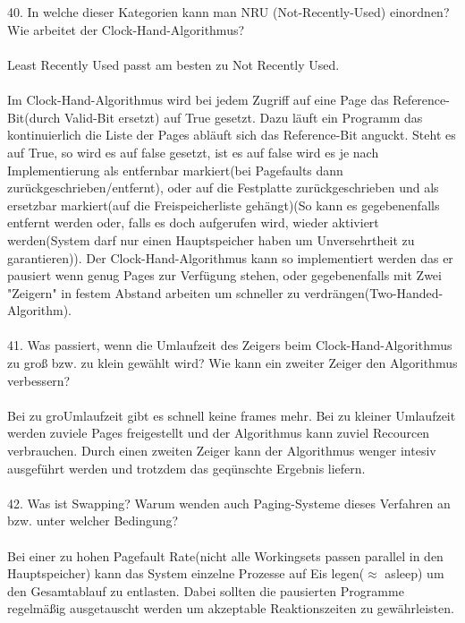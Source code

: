 \documentclass{article}
\begin{document}
\\
\\
40. In welche dieser Kategorien kann man NRU (Not-Recently-Used) einordnen? Wie arbeitet
der Clock-Hand-Algorithmus?
\\
\\
Least Recently Used passt am besten zu Not Recently Used.
\\
\\
Im Clock-Hand-Algorithmus wird bei jedem Zugriff auf eine Page das Reference-Bit(durch Valid-Bit ersetzt) auf True gesetzt. Dazu l\"auft ein Programm das kontinuierlich die Liste der Pages abl\"auft sich das Reference-Bit anguckt. Steht es auf True, so wird es auf false gesetzt, ist es auf false wird es je nach Implementierung als entfernbar markiert(bei Pagefaults dann zur\"uckgeschrieben/entfernt), oder auf die Festplatte zur\"uckgeschrieben und als ersetzbar markiert(auf die Freispeicherliste geh\"angt)(So kann es gegebenenfalls entfernt werden oder, falls es doch aufgerufen wird, wieder aktiviert werden(System darf nur einen Hauptspeicher haben um Unversehrtheit zu garantieren)).
Der Clock-Hand-Algorithmus kann so implementiert werden das er pausiert wenn genug Pages zur Verf\"ugung stehen, oder gegebenenfalls mit Zwei "Zeigern" in festem Abstand arbeiten um schneller zu verdr\"angen(Two-Handed-Algorithm).
\\
\\
41. Was passiert, wenn die Umlaufzeit des Zeigers beim Clock-Hand-Algorithmus zu groß bzw.
zu klein gewählt wird? Wie kann ein zweiter Zeiger den Algorithmus verbessern?
\\
\\
Bei zu gro\sser Umlaufzeit gibt es schnell keine frames mehr. Bei zu kleiner Umlaufzeit werden zuviele Pages freigestellt und der Algorithmus kann zuviel Recourcen verbrauchen. Durch einen zweiten Zeiger kann der Algorithmus wenger intesiv ausgef\"uhrt werden und trotzdem das geq\"unschte Ergebnis liefern.
\\
\\
42. Was ist Swapping? Warum wenden auch Paging-Systeme dieses Verfahren an bzw. unter
welcher Bedingung?
\\
\\
Bei einer zu hohen Pagefault Rate(nicht alle Workingsets passen parallel in den Hauptspeicher) kann das System einzelne Prozesse auf Eis legen($\approx$ asleep) um den Gesamtablauf zu entlasten. Dabei sollten die pausierten Programme regelm\"a\ss ig ausgetauscht werden um akzeptable Reaktionszeiten zu gew\"ahrleisten.
\end{document}
